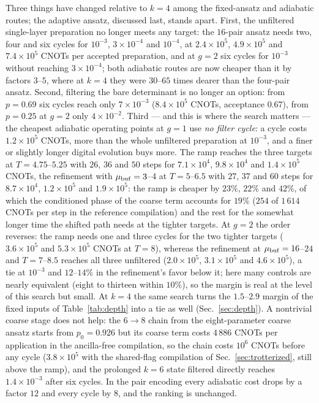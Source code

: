 \documentclass[
  aps,            %
  prc,            %
  reprint,        %
  superscriptaddress,
  floatfix,
  nofootinbib
]{revtex4-2}
\begin{document}
Three things have changed relative to $k=4$ among the fixed-ansatz and
adiabatic routes; the adaptive ansatz, discussed last, stands apart.
First, the unfiltered single-layer preparation no longer meets any target:
the $16$-pair ansatz needs two, four and six cycles for $10^{-3}$,
$3\times10^{-4}$ and $10^{-4}$, at $2.4\times10^{5}$, $4.9\times10^{5}$ and
$7.4\times10^{5}$ CNOTs per accepted preparation, and at $g=2$ six cycles
for $10^{-3}$ without reaching $3\times10^{-4}$; both adiabatic routes are
now cheaper than it by factors $3$--$5$, where at $k=4$ they were
$30$--$65$ times dearer than the four-pair ansatz.  Second, filtering the
bare determinant is no longer an option: from $p=0.69$ six cycles reach
only $7\times10^{-3}$ ($8.4\times10^{5}$ CNOTs, acceptance $0.67$), from
$p=0.25$ at $g=2$ only $4\times10^{-2}$.  Third --- and this is where the
search matters --- the cheapest adiabatic operating points at $g=1$
use \emph{no filter cycle}: a cycle costs $1.2\times10^{5}$ CNOTs, more
than the whole unfiltered preparation at $10^{-3}$, and a finer or slightly
longer digital evolution buys more.  The ramp reaches the three targets
at $T=4.75$--$5.25$ with $26$, $36$ and $50$ steps for $7.1\times10^{4}$,
$9.8\times10^{4}$ and $1.4\times10^{5}$ CNOTs, the refinement with
$\mu_{\rm buf}=3$--$4$ at $T=5$--$6.5$ with $27$, $37$ and $60$ steps for
$8.7\times10^{4}$, $1.2\times10^{5}$ and $1.9\times10^{5}$: the ramp is
cheaper by $23\%$, $22\%$ and $42\%$, of which the conditioned phase of
the coarse term accounts for $19\%$ ($254$ of $1\,614$ CNOTs per step in
the reference compilation) and the rest for the somewhat longer time the
shifted path needs at the tighter targets.  At $g=2$ the order reverses:
the ramp needs one and three cycles for the two tighter targets
($3.6\times10^{5}$ and $5.3\times10^{5}$ CNOTs at $T=8$), whereas the
refinement at $\mu_{\rm buf}=16$--$24$ and $T=7$--$8.5$ reaches all three
unfiltered ($2.0\times10^{5}$, $3.1\times10^{5}$ and $4.6\times10^{5}$),
a tie at $10^{-3}$ and $12$--$14\%$ in the refinement's favor below it;
here many controls are nearly equivalent (eight to thirteen within
$10\%$), so the margin is real at the level of this search but small.  At
$k=4$ the same search turns the $1.5$--$2.9$ margin of the fixed inputs of
Table~\ref{tab:depth} into a tie as well (Sec.~\ref{sec:depth}).  A
nontrivial coarse stage does not help: the $6\to8$ chain from the
eight-parameter coarse ansatz starts from $p_0=0.926$ but its coarse term
costs $4\,886$ CNOTs per application in the ancilla-free compilation, so
the chain costs $10^{6}$ CNOTs before any cycle ($3.8\times10^{5}$ with
the shared-flag compilation of Sec.~\ref{sec:trotterized}, still above the
ramp), and the prolonged $k=6$ state filtered directly reaches
$1.4\times10^{-3}$ after six cycles.  In the pair encoding every adiabatic
cost drops by a factor $12$ and every cycle by $8$, and the ranking is
unchanged.
\end{document}
